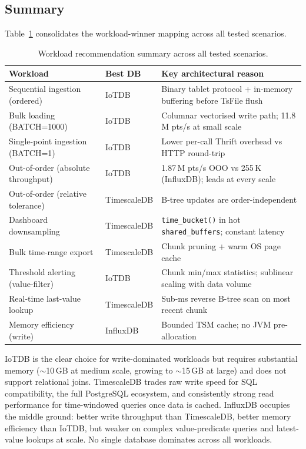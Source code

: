 \subsection{Summary}
\label{sec:results-summary}

Table~\ref{tab:summary} consolidates the workload-winner mapping across all tested scenarios.

\begin{table}[t]
  \centering
  \caption{Workload recommendation summary across all tested scenarios.}
  \label{tab:summary}
  \begin{tabular}{lll}
    \hline
    \textbf{Workload} & \textbf{Best DB} & \textbf{Key architectural reason} \\
    \hline
    Sequential ingestion (ordered)     & IoTDB       & Binary tablet protocol + in-memory buffering before TsFile flush \\
    Bulk loading (BATCH=1000)          & IoTDB       & Columnar vectorised write path; 11.8\,M pts/s at small scale \\
    Single-point ingestion (BATCH=1)   & IoTDB       & Lower per-call Thrift overhead vs HTTP round-trip \\
    Out-of-order (absolute throughput) & IoTDB       & 1.87\,M pts/s OOO vs 255\,K (InfluxDB); leads at every scale \\
    Out-of-order (relative tolerance)  & TimescaleDB & B-tree updates are order-independent \\
    Dashboard downsampling             & TimescaleDB & \texttt{time\_bucket()} in hot \texttt{shared\_buffers}; constant latency \\
    Bulk time-range export             & TimescaleDB & Chunk pruning + warm OS page cache \\
    Threshold alerting (value-filter)  & IoTDB       & Chunk min/max statistics; sublinear scaling with data volume \\
    Real-time last-value lookup        & TimescaleDB & Sub-ms reverse B-tree scan on most recent chunk \\
    Memory efficiency (write)          & InfluxDB    & Bounded TSM cache; no JVM pre-allocation \\
    \hline
  \end{tabular}
\end{table}

IoTDB is the clear choice for write-dominated workloads but requires substantial memory
($\sim$10\,GB at medium scale, growing to $\sim$15\,GB at large) and does not support
relational joins. TimescaleDB trades raw write speed for SQL compatibility, the full
PostgreSQL ecosystem, and consistently strong read performance for time-windowed queries
once data is cached. InfluxDB occupies the middle ground: better write throughput than
TimescaleDB, better memory efficiency than IoTDB, but weaker on complex value-predicate
queries and latest-value lookups at scale. No single database dominates across all workloads.
